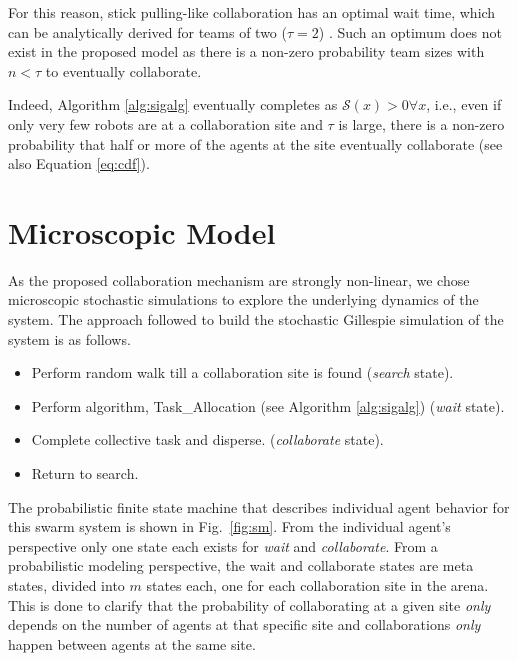 \documentclass{TeXstyles/DARS/svmult}  %
\newcommand{\sig}{\mathcal{S}}
\begin{document}
For this reason, stick pulling-like collaboration \cite{Lerman2001} has an optimal wait time, which can be analytically derived for teams of two ($\tau=2$) \cite{Martinoli2004}. Such an optimum does not exist in the proposed model as there is a non-zero probability team sizes with $n<\tau$ to eventually collaborate. 

Indeed, Algorithm \ref{alg:sigalg} eventually completes as $\sig(x) > 0 \forall x$, i.e., even if only very few robots are at a collaboration site and $\tau$ is large, there is a non-zero probability that half or more of the agents at the site eventually collaborate (see also Equation \ref{eq:cdf}).




\section{Microscopic Model}\label{sec:micromodel}
As the proposed collaboration mechanism are strongly non-linear, we chose microscopic stochastic simulations to explore the underlying dynamics of the system. The approach followed to build the stochastic Gillespie simulation of the system is as follows.
\begin{itemize}
\item Perform random walk till a collaboration site is found (\emph{search} state).
\item Perform algorithm, Task\_Allocation (see Algorithm \ref{alg:sigalg}) (\emph{wait} state).
\item Complete collective task and disperse. (\emph{collaborate} state).
\item Return to search.
\end{itemize}

The probabilistic finite state machine that describes individual agent behavior for this swarm system is shown in Fig.~\ref{fig:sm}. From the individual agent's perspective only one state each exists for \emph{wait} and \emph{collaborate}. From a probabilistic modeling perspective, the wait and collaborate states are meta states, divided into $m$ states each, one for each collaboration site in the arena. This is done to clarify that the probability of collaborating at a given site \emph{only} depends on the number of agents at that specific site and collaborations \emph{only} happen between agents at the same site.
\end{document}
